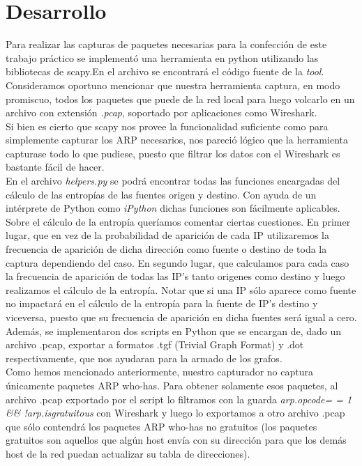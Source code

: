 \section{Desarrollo}

\indent \indent Para realizar las capturas de paquetes necesarias para la confección de este trabajo práctico se implementó una herramienta en python utilizando las bibliotecas de scapy.En el archivo  se encontrará el código fuente de la \textit{tool}. Consideramos oportuno mencionar que nuestra herramienta captura, en modo promiscuo, todos los paquetes que puede de la red local para luego volcarlo en un archivo con extensión \textit{.pcap}, soportado por aplicaciones como Wireshark.\\
\indent Si bien es cierto que scapy nos provee la funcionalidad suficiente como para simplemente capturar los ARP necesarios, nos pareció lógico que la herramienta capturase todo lo que pudiese, puesto que filtrar los datos con el Wireshark es bastante fácil de hacer.\\
\indent En el archivo \textit{helpers.py} se podrá encontrar todas las funciones encargadas del cálculo de las entropías de las fuentes origen y destino. Con ayuda de un intérprete de Python como \textit{iPython} dichas funciones son fácilmente aplicables.\\
\indent Sobre el cálculo de la entropía queríamos comentar ciertas cuestiones. En primer lugar, que en vez de la probabilidad de aparición de cada IP utilizaremos la frecuencia de aparición de dicha dirección como fuente o destino de toda la captura dependiendo del caso. En segundo lugar, que calculamos para cada caso la frecuencia de aparición de todas las IP's tanto origenes como destino y luego realizamos el cálculo de la entropía. Notar que si una IP sólo aparece como fuente no impactará en el cálculo de la entropía para la fuente de IP's destino y viceversa, puesto que su frecuencia de aparición en dicha fuentes será igual a cero.\\
\indent Además, se implementaron dos scripts en Python que se encargan de, dado un archivo .pcap, exportar a formatos .tgf (Trivial Graph Format) y .dot respectivamente, que nos ayudaran para la armado de los grafos.\\
\indent Como hemos mencionado anteriormente, nuestro capturador no captura únicamente paquetes ARP who-has. Para obtener solamente esos paquetes, al archivo .pcap exportado por el script lo filtramos con la guarda \textit {arp.opcode= = 1 && !arp.isgratuitous} con Wireshark y luego lo exportamos a otro archivo .pcap que sólo contendrá los paquetes ARP who-has no gratuitos (los paquetes gratuitos son aquellos que algún host envía con su dirección para que los demás host de la red puedan actualizar su tabla de direcciones).\\ 
